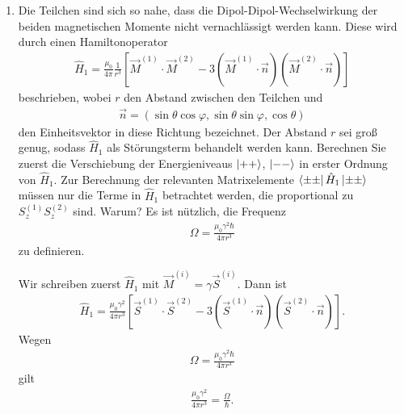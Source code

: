 \documentclass[11pt,a4paper]{scrartcl}
\newcommand{\op}[1]{\hat{#1}}
\begin{document}
\begin{enumerate}[label=(\alph*)]
        \item Die Teilchen sind sich so nahe, dass die Dipol-Dipol-Wechselwirkung der beiden magnetischen Momente nicht vernachlässigt werden kann. Diese wird durch einen Hamiltonoperator
        \begin{align*}
            \op H_1
            =
            \frac{\mu_0}{4\pi}\frac{1}{r^3}
            \left[
                \vec M^{(1)}\cdot \vec M^{(2)}
                -3(\vec M^{(1)}\cdot\vec n)(\vec M^{(2)}\cdot\vec n)
            \right]
        \end{align*}
        beschrieben, wobei $r$ den Abstand zwischen den Teilchen und
        \begin{align*}
            \vec n
            =
            (\sin\theta\cos\varphi,\sin\theta\sin\varphi,\cos\theta)
        \end{align*}
        den Einheitsvektor in diese Richtung bezeichnet. Der Abstand $r$ sei groß genug, sodass $\op H_1$ als Störungsterm behandelt werden kann. Berechnen Sie zuerst die Verschiebung der Energieniveaus $\ket{++}$, $\ket{--}$ in erster Ordnung von $\op H_1$. Zur Berechnung der relevanten Matrixelemente $\bra{\pm\pm}\op H_1\ket{\pm\pm}$ müssen nur die Terme in $\op H_1$ betrachtet werden, die proportional zu $S_z^{(1)}S_z^{(2)}$ sind. Warum? Es ist nützlich, die Frequenz
        \begin{align*}
            \Omega
            =
            \frac{\mu_0\gamma^2\hbar}{4\pi r^3}
        \end{align*}
        zu definieren.

        \begin{calculationbox}
            \begin{solutionbox}
                Wir schreiben zuerst $\op H_1$ mit $\vec M^{(i)}=\gamma\vec S^{(i)}$. Dann ist
                \begin{align*}
                    \op H_1
                    =
                    \frac{\mu_0\gamma^2}{4\pi r^3}
                    \left[
                        \vec S^{(1)}\cdot \vec S^{(2)}
                        -3(\vec S^{(1)}\cdot\vec n)(\vec S^{(2)}\cdot\vec n)
                    \right].
                \end{align*}
                Wegen
                \begin{align*}
                    \Omega
                    =
                    \frac{\mu_0\gamma^2\hbar}{4\pi r^3}
                \end{align*}
                gilt
                \begin{align*}
                    \frac{\mu_0\gamma^2}{4\pi r^3}
                    =
                    \frac{\Omega}{\hbar}.
                \end{align*}
            \end{solutionbox}


\end{calculationbox}
\end{enumerate}
\end{document}
